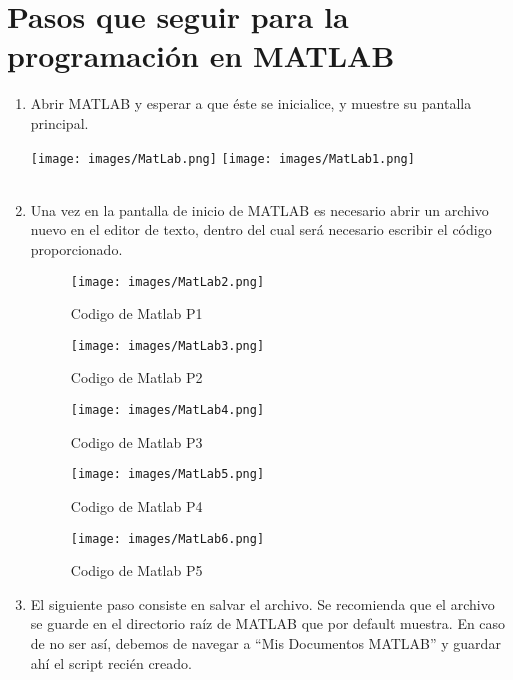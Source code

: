 \documentclass{article}
\begin{document}
\section{Pasos que seguir para la programación en MATLAB}
\begin{enumerate}
\item   Abrir MATLAB y esperar a que éste se inicialice, y muestre su pantalla principal. 

\texttt{[image: images/MatLab.png]} %
\texttt{[image: images/MatLab1.png]} %
\\
\\
\item   Una vez en la pantalla de inicio de MATLAB es necesario abrir un archivo nuevo en el editor de texto, dentro del cual será necesario escribir el código proporcionado.

\begin{figure}[h] %
    \centering
    \texttt{[image: images/MatLab2.png]} %
    \caption{Codigo de Matlab P1}
\end{figure}

\begin{figure}[h] %
    \centering
    \texttt{[image: images/MatLab3.png]} %
    \caption{Codigo de Matlab P2}
\end{figure}

\newpage

\begin{figure}[h] %
    \centering
    \texttt{[image: images/MatLab4.png]} %
    \caption{Codigo de Matlab P3}
\end{figure}

\begin{figure}[h] %
    \centering
    \texttt{[image: images/MatLab5.png]} %
    \caption{Codigo de Matlab P4}
\end{figure}

\begin{figure}[h] %
    \centering
    \texttt{[image: images/MatLab6.png]} %
    \caption{Codigo de Matlab P5}
\end{figure}

\newpage

\item   El siguiente paso consiste en salvar el archivo. Se recomienda que el archivo se guarde en el directorio raíz de MATLAB que por default muestra. En caso de no ser así, debemos de navegar a “Mis Documentos  MATLAB” y guardar ahí el script recién creado. 


\end{enumerate}
\end{document}
